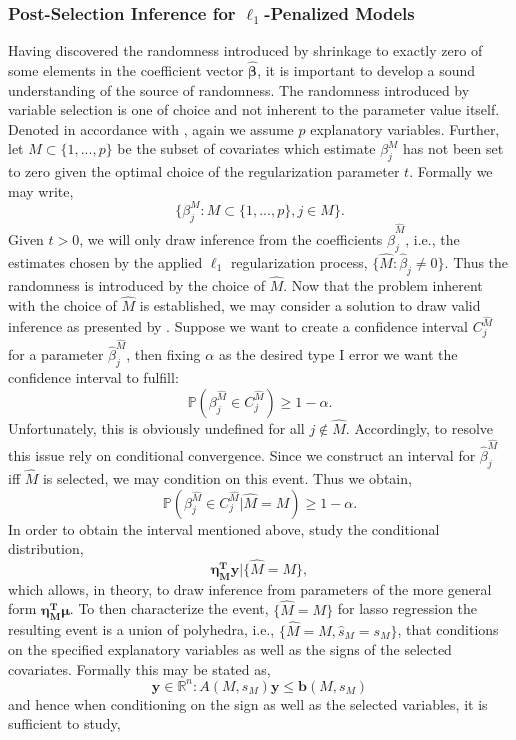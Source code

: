 \documentclass[a4paper,12pt, headsepline]{scrartcl}
\numberwithin{equation}{section}
\begin{document}
\subsubsection{Post-Selection Inference for $\ell_1$-Penalized Models}\label{subsubsec:psi}
Having discovered the randomness introduced by shrinkage to exactly zero of some elements in the coefficient vector $\bm{\hat{\beta}}$, it is important to develop a sound understanding of the source of randomness. The randomness introduced by variable selection is one of choice and not inherent to the parameter value itself. Denoted in accordance with \citet{Lee2016}, again we assume $p$ explanatory variables. Further, let $M\subset\{1, ..., p\}$ be the subset of covariates which estimate $\beta_j^M$ has not been set to zero given the optimal choice of the regularization parameter $t$. Formally we may write,
\[
\{\beta_j^M: M\subset\{1, ..., p\}, j \in M\}.
\]
Given $t > 0$, we will only draw inference from the coefficients $\hat\beta_j^{\hat M}$, i.e., the estimates chosen by the applied $\ell_1$ regularization process, $\{\hat M: \hat\beta_j \neq 0\}$. Thus the randomness is introduced by the choice of $\hat M$. Now that the problem inherent with the choice of $\hat M$ is established, we may consider a solution to draw valid inference as presented by \citet{Lee2016}. Suppose we want to create a confidence interval $C_j^{\hat M}$ for a parameter $\hat\beta_j^{\hat M}$, then fixing $\alpha$ as the desired type I error we want the confidence interval to fulfill:
\[
\mathbb{P}(\beta_j^{\hat M} \in C_j^{\hat M}) \geq 1 - \alpha.
\]
Unfortunately, this is obviously undefined for all $j \notin \hat M$. Accordingly, to resolve this issue \citet{Lee2016} rely on conditional convergence. Since we construct an interval for $\hat\beta_j^{\hat M}$ iff $\hat M$ is selected, we may condition on this event. Thus we obtain,
\[
\mathbb{P}(\beta_j^{\hat M} \in C_j^{\hat M}| \hat M = M) \geq 1 - \alpha.
\]
In order to obtain the interval mentioned above, \citet{Lee2016} study the conditional distribution,
\[
\bm{\eta_M^Ty}|\{\hat M = M\},
\]
which allows, in theory, to draw inference from parameters of the more general form $\bm{\eta_M^T\mu}$. To then characterize the event, $\{\hat M = M\}$ for lasso regression the resulting event is a union of polyhedra, i.e., $\{\hat M = M, \hat s_M = s_M\}$, that conditions on the specified explanatory variables as well as the signs of the selected covariates. Formally this may be stated as,
\[
\bm{y} \in \mathbb{R}^n: A(M, s_M)\bm{y} \leq \bm{b}(M, s_M)
\]
and hence when conditioning on the sign as well as the selected variables, it is sufficient to study,
\end{document}
